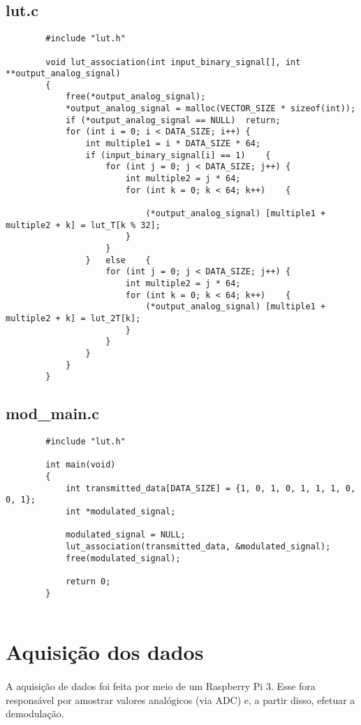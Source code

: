 \documentclass[11pt,a4paper]{report}
\begin{document}
	\subsection{lut.c}
		\begin{verbatim}
		#include "lut.h"
		
		void lut_association(int input_binary_signal[], int **output_analog_signal)
		{
			free(*output_analog_signal);
			*output_analog_signal = malloc(VECTOR_SIZE * sizeof(int));
			if (*output_analog_signal == NULL)	return;
			for (int i = 0; i < DATA_SIZE; i++)	{
				int multiple1 = i * DATA_SIZE * 64;
				if (input_binary_signal[i] == 1)	{
					for (int j = 0; j < DATA_SIZE; j++)	{
						int multiple2 = j * 64;
						for (int k = 0; k < 64; k++)	{
							
							(*output_analog_signal) [multiple1 + multiple2 + k] = lut_T[k % 32];
						}
					}
				}	else	{
					for (int j = 0; j < DATA_SIZE; j++)	{
						int multiple2 = j * 64;
						for (int k = 0; k < 64; k++)	{
							(*output_analog_signal) [multiple1 + multiple2 + k] = lut_2T[k];
						}
					}
				}
			}
		}
		\end{verbatim}
		
	\subsection{mod\_main.c}
		\begin{verbatim}
		#include "lut.h"
		
		int main(void)
		{
			int transmitted_data[DATA_SIZE] = {1, 0, 1, 0, 1, 1, 1, 0, 0, 1};
			int *modulated_signal;
		
			modulated_signal = NULL;
			lut_association(transmitted_data, &modulated_signal);
			free(modulated_signal);
		
			return 0;
		}
		
		\end{verbatim}
		
	\section{Aquisição dos dados}
		\paragraph{}
		A aquisição de dados foi feita por meio de um Raspberry Pi 3. Esse fora responsável por amostrar valores analógicos (via ADC) e, a partir disso, efetuar a demodulação.
	
\end{document}
